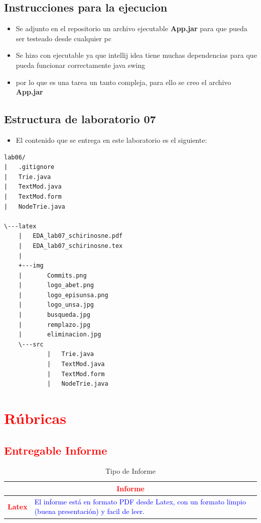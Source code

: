 \documentclass{article}
\begin{document}
\subsection{Instrucciones para la ejecucion}
\begin{itemize}	
	\item Se adjunto en el repositorio un archivo ejecutable \textbf{App.jar} para que pueda ser testeado desde cualquier pc
	\item Se hizo con ejecutable ya que intellij idea tiene muchas dependencias para que pueda funcionar correctamente java swing
	\item por lo que es una tarea un tanto compleja, para ello se creo el archivo \textbf{App.jar}
\end{itemize}	
		
	\subsection{Estructura de laboratorio 07}
	\begin{itemize}	
		\item El contenido que se entrega en este laboratorio es el siguiente:
	\end{itemize}
	
\begin{lstlisting}[style=ascii-tree]
lab06/
|   .gitignore
|	Trie.java
|	TextMod.java
|	TextMod.form
|	NodeTrie.java

\---latex
    |	EDA_lab07_schirinosne.pdf
    |   EDA_lab07_schirinosne.tex
    |
    +---img
    |       Commits.png
    |       logo_abet.png
    |       logo_episunsa.png
    |       logo_unsa.jpg
    |       busqueda.jpg  
    |       remplazo.jpg    
    |		eliminacion.jpg
    \---src
			|	Trie.java
			|	TextMod.java
			|	TextMod.form
			|	NodeTrie.java
\end{lstlisting}    


	\section{\textcolor{red}{Rúbricas}}
	
	\subsection{\textcolor{red}{Entregable Informe}}
	\begin{table}[H]
		\caption{Tipo de Informe}
		\setlength{\tabcolsep}{0.5em} %
		{\renewcommand{\arraystretch}{1.5}%
		
		\begin{tabular}{|p{3cm}|p{12cm}|}
			\hline
			\multicolumn{2}{|c|}{\textbf{\textcolor{red}{Informe}}}  \\
			\hline 
			\textbf{\textcolor{red}{Latex}} & \textcolor{blue}{El informe está en formato PDF desde Latex,  con un formato limpio (buena presentación) y facil de leer.}   \\ 
			\hline 
			
			
		\end{tabular}
	}
	\end{table}
\end{document}
